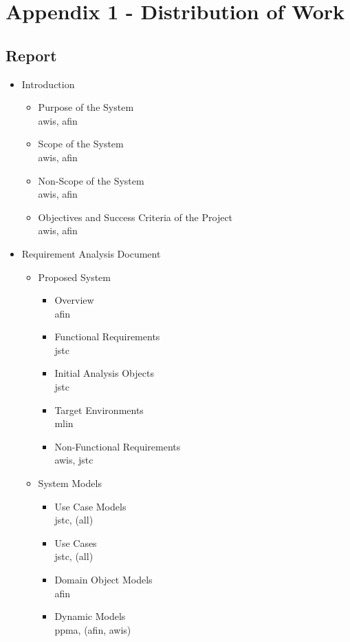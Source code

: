 \section{Appendix 1 - Distribution of Work}
\subsection{Report}
\begin{itemize}
	\item Introduction
	\begin{itemize}
		\item Purpose of the System\\
		awis, afin
		\item Scope of the System\\
		awis, afin
		\item Non-Scope of the System\\
		awis, afin
		\item Objectives and Success Criteria of the Project \\
		awis, afin
	\end{itemize}
	\item Requirement Analysis Document
	\begin{itemize}
		\item Proposed System
		\begin{itemize}
			\item Overview\\
			afin
			\item Functional Requirements\\
			jstc
			\item Initial Analysis Objects\\
			jstc
			\item Target Environments\\
			mlin
			\item Non-Functional Requirements\\
			awis, jstc
		\end{itemize}

		\item System Models
		\begin{itemize}
			\item Use Case Models\\
			jstc, (all)
			\item Use Cases\\
			jstc, (all)
			\item Domain Object Models\\
			afin
			\item Dynamic Models\\
			ppma, (afin, awis)
		\end{itemize}	
	\end{itemize}


\end{itemize}
